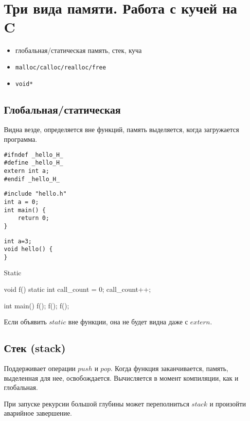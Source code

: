 % 
% 
\section{Три вида памяти. Работа с кучей на C}
\begin{itemize}[noitemsep]
    \item глобальная/статическая память, стек, куча
    \item \begin{verbatim}malloc/calloc/realloc/free\end{verbatim}
    \item \begin{verbatim}void*\end{verbatim}
\end{itemize}
\subsection{Глобальная/статическая}
Видна везде, определяется вне функций, память выделяется, когда загружается программа.
\begin{verbatim}
#ifndef _hello_H_
#define _hello_H_
extern int a;
#endif _hello_H_
\end{verbatim}
\begin{verbatim}
#include "hello.h"
int a = 0;
int main() {
    return 0;
}
\end{verbatim}
\begin{verbatim}
int a=3;
void hello() {
}
\end{verbatim}
Static
\begin{ccode}
void f() {
static int call_count = 0;
call_count++;
}

int main() {
    f(); f(); f();
}
\end{ccode}
Если объявить $ static$ вне функции, она не будет видна даже с $ extern$.
\subsection{Стек (stack)}
Поддерживает операции $ push$ и  $ pop$.
Когда функция заканчивается, память, выделенная для нее, освобождается.
Вычисляется в момент компиляции, как и глобальная.

При запуске рекурсии большой глубины может переполниться $ stack$ и произойти аварийное завершение.
